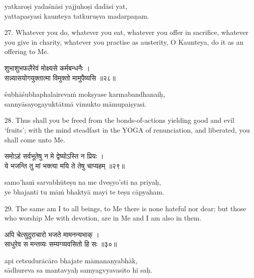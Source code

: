 \begin{transliteration}
yatkaroṣi yadaśnāsi yajjuhoṣi dadāsi yat, \\
yattapasyasi kaunteya tatkuruṣva madarpaṇam.
\end{transliteration}

27. Whatever you do, whatever you eat, whatever you offer in sacrifice,
whatever you give in charity, whatever you practise as austerity, O Kaunteya,
do it as an offering to Me.

\begin{gitaverse}
शुभाशुभफलैरेवं मोक्ष्यसे कर्मबन्धनैः । \\
सन्न्यासयोगयुक्तात्मा विमुक्तो मामुपैष्यसि ॥२८॥
\end{gitaverse}

\begin{transliteration}
śubhāśubhaphalairevaṁ mokṣyase karmabandhanaiḥ, \\
sannyāsayogayuktātmā vimukto māmupaiṣyasi.
\end{transliteration}

28. Thus shall you be freed from the bonds-of-actions yielding good and evil
`fruits'; with the mind steadfast in the YOGA of renunciation, and liberated,
you shall come unto Me.

\begin{gitaverse}
समोऽहं सर्वभूतेषु न मे द्वेष्योऽस्ति न प्रियः । \\
ये भजन्ति तु मां भक्त्या मयि ते तेषु चाप्यहम् ॥२९॥
\end{gitaverse}

\begin{transliteration}
samo'haṁ sarvabhūteṣu na me dveṣyo'sti na priyaḥ, \\
ye bhajanti tu māṁ bhaktyā mayi te teṣu cāpyaham.
\end{transliteration}

29. The same am I to all beings, to Me there is none hateful nor dear; but
those who worship Me with devotion, are in Me and I am also in them.

\begin{gitaverse}
अपि चेत्सुदुराचारो भजते मामनन्यभाक् । \\
साधुरेव स मन्तव्यः सम्यग्व्यवसितो हि सः ॥३०॥
\end{gitaverse}

\begin{transliteration}
api cetsudurācāro bhajate māmananyabhāk, \\
sādhureva sa mantavyaḥ samyagvyavasito hi saḥ.
\end{transliteration}

